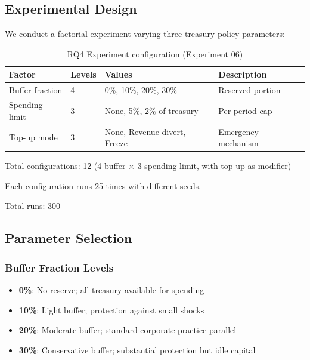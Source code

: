 
\subsection{Experimental Design}

We conduct a factorial experiment varying three treasury policy parameters:

\begin{table}[htbp]
\centering
\caption{RQ4 Experiment configuration (Experiment 06)}
\label{tab:rq4-experiment}
\begin{tabular}{@{}llll@{}}
\toprule
Factor & Levels & Values & Description \\
\midrule
Buffer fraction & 4 & 0\%, 10\%, 20\%, 30\% & Reserved portion \\
Spending limit & 3 & None, 5\%, 2\% of treasury & Per-period cap \\
Top-up mode & 3 & None, Revenue divert, Freeze & Emergency mechanism \\
\bottomrule
\end{tabular}
\end{table}

Total configurations: 12 (4 buffer $\times$ 3 spending limit, with top-up as modifier)

Each configuration runs 25 times with different seeds.

Total runs: 300

\subsection{Parameter Selection}

\subsubsection{Buffer Fraction Levels}

\begin{itemize}
    \item \textbf{0\%}: No reserve; all treasury available for spending
    \item \textbf{10\%}: Light buffer; protection against small shocks
    \item \textbf{20\%}: Moderate buffer; standard corporate practice parallel
    \item \textbf{30\%}: Conservative buffer; substantial protection but idle capital
\end{itemize}

